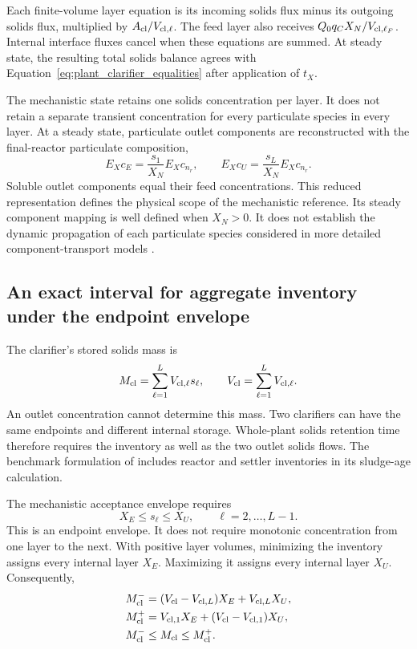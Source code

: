 Each finite-volume layer equation is its incoming solids flux minus its outgoing solids flux, multiplied by $A_{\rm cl}/V_{{\rm cl},\ell}$. The feed layer also receives $Q_0q_CX_N/V_{{\rm cl},\ell_F}$. Internal interface fluxes cancel when these equations are summed. At steady state, the resulting total solids balance agrees with Equation~\eqref{eq:plant_clarifier_equalities} after application of $t_X$.

The mechanistic state retains one solids concentration per layer. It does not retain a separate transient concentration for every particulate species in every layer. At a steady state, particulate outlet components are reconstructed with the final-reactor particulate composition,
\begin{equation}
E_Xc_E=\frac{s_1}{X_N}E_Xc_{n_r},\qquad
E_Xc_U=\frac{s_L}{X_N}E_Xc_{n_r}.
\label{eq:plant_outlet_reconstruction}
\end{equation}
Soluble outlet components equal their feed concentrations. This reduced representation defines the physical scope of the mechanistic reference. Its steady component mapping is well defined when $X_N>0$. It does not establish the dynamic propagation of each particulate species considered in more detailed component-transport models \citep{JeppssonDiehl1996}.

\subsection{An exact interval for aggregate inventory under the endpoint envelope}

The clarifier's stored solids mass is
\begin{equation}
M_{\rm cl}=\sum_{\ell=1}^{L}V_{{\rm cl},\ell}s_\ell,\qquad
V_{\rm cl}=\sum_{\ell=1}^{L}V_{{\rm cl},\ell}.
\label{eq:plant_inventory_definition}
\end{equation}
An outlet concentration cannot determine this mass. Two clarifiers can have the same endpoints and different internal storage. Whole-plant solids retention time therefore requires the inventory as well as the two outlet solids flows. The benchmark formulation of \citet{Alex2008} includes reactor and settler inventories in its sludge-age calculation.

The mechanistic acceptance envelope requires
\begin{equation}
X_E\le s_\ell\le X_U,\qquad \ell=2,\ldots,L-1.
\label{eq:plant_layer_envelope}
\end{equation}
This is an endpoint envelope. It does not require monotonic concentration from one layer to the next. With positive layer volumes, minimizing the inventory assigns every internal layer $X_E$. Maximizing it assigns every internal layer $X_U$. Consequently,
\begin{align}
M_{\rm cl}^{-}&=(V_{\rm cl}-V_{{\rm cl},L})X_E+V_{{\rm cl},L}X_U,\\
M_{\rm cl}^{+}&=V_{{\rm cl},1}X_E+(V_{\rm cl}-V_{{\rm cl},1})X_U,\\
M_{\rm cl}^{-}&\le M_{\rm cl}\le M_{\rm cl}^{+}.
\label{eq:plant_inventory_bounds}
\end{align}

